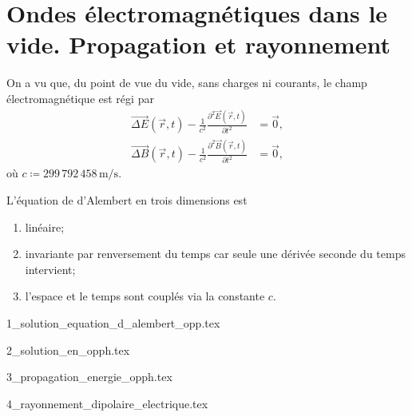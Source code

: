 \chapter[Ondes dans le vide]{Ondes électromagnétiques dans le vide. Propagation et rayonnement}

On a vu que, du point de vue du vide, sans charges ni courants, le champ électromagnétique est régi par
\begin{equation*}
    \boxed{
        \begin{aligned}
            \vec{\Delta E}(\vec{r},t)-\frac{1}{c^{2}}\frac{\partial ^{2}\vec{E}(\vec{r},t)}{\partial t^{2}}&=\vec{0},\\
            \vec{\Delta B}(\vec{r},t)-\frac{1}{c^{2}}\frac{\partial ^{2}\vec{B}(\vec{r},t)}{\partial t^{2}}&=\vec{0},
        \end{aligned}
    }
\end{equation*}
où $c\coloneqq 299\,792\,458\,\si{\metre\per\second}$.

L'équation de d'Alembert en trois dimensions est
\begin{enumerate}[label=(\roman*)]
    \item linéaire;
    \item invariante par renversement du temps car seule une dérivée seconde du temps intervient;
    \item l'espace et le temps sont couplés via la constante $c$.
\end{enumerate}


\minitoc

{1_solution_equation_d_alembert_opp.tex}

{2_solution_en_opph.tex}

{3_propagation_energie_opph.tex}

{4_rayonnement_dipolaire_electrique.tex}